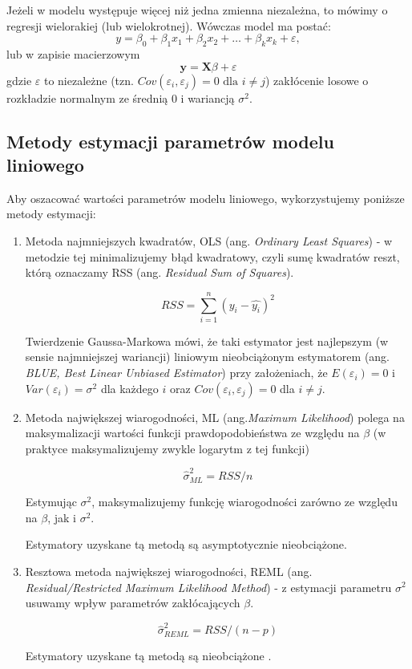 \documentclass[12pt]{mwbk}
\theoremstyle{plain}
\theoremstyle{definition}
\theoremstyle{remark}
\newcommand{\yy}{\mathbf{y}}
\begin{document}
Jeżeli w modelu występuje więcej niż jedna zmienna niezależna, to mówimy o regresji wielorakiej (lub wielokrotnej). Wówczas model ma postać: $$y=\beta_0+\beta_1 x_1+\beta_2 x_2 + \ldots + \beta_k x_k + \varepsilon,$$ lub w zapisie macierzowym $$\yy=\mathbf{X}\beta+\varepsilon$$
gdzie $\varepsilon$ to niezależne (tzn. $Cov(\varepsilon_i, \varepsilon_j)=0 \text{ dla }i\neq j$) zakłócenie losowe o rozkładzie normalnym ze średnią 0 i wariancją $\sigma^2$.

\subsection{Metody estymacji parametrów modelu liniowego}
Aby oszacować wartości parametrów modelu liniowego, wykorzystujemy poniższe metody estymacji:
\begin{enumerate}
	\item Metoda najmniejszych kwadratów, OLS (ang. \emph{Ordinary Least Squares}) - w metodzie tej minimalizujemy błąd kwadratowy, czyli sumę kwadratów reszt, którą oznaczamy RSS (ang. \emph{Residual Sum of Squares}).
	
	$$RSS= \sum_{i=1}^{n}(y_i-\hat{y_i})^2$$
	
	Twierdzenie Gaussa-Markowa mówi, że taki estymator jest najlepszym (w sensie najmniejszej wariancji) liniowym nieobciążonym estymatorem (ang. \textit{BLUE, Best Linear Unbiased Estimator}) przy założeniach, że $E(\varepsilon_i)=0$ i $Var(\varepsilon_i)=\sigma^2$ dla każdego $i$ oraz $Cov(\varepsilon_i, \varepsilon_j)=0$ dla $i \neq j$.

	\item Metoda największej wiarogodności, ML (ang.\textit{Maximum Likelihood}) polega na maksymalizacji wartości funkcji prawdopodobieństwa ze względu na $\beta$ (w praktyce maksymalizujemy zwykle logarytm z tej funkcji)
	
	$$\hat{\sigma}^{2}_{ML}=RSS/n$$
	
	Estymując $\sigma^2$, maksymalizujemy funkcję wiarogodności zarówno ze względu na $\beta$, jak i $\sigma^2$.
	
	Estymatory uzyskane tą metodą są asymptotycznie nieobciążone.
	
	\item Resztowa metoda największej wiarogodności, REML (ang. \textit{Residual/Restricted Maximum Likelihood Method}) - z estymacji parametru $\sigma^2$ usuwamy wpływ parametrów zakłócających $\beta$.
	
	$$\hat{\sigma}^2_{REML}=RSS/(n-p)$$
	
	Estymatory uzyskane tą metodą są nieobciążone \cite{biecek}.
\end{enumerate}
\end{document}
